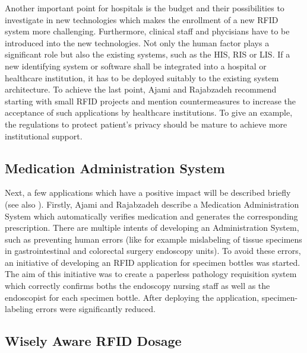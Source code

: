 Another important point for hospitals is the budget and their possibilities to investigate in new technologies which makes the enrollment of a new RFID system more challenging. Furthermore, clinical staff and phycisians have to be introduced into the new technologies. Not only the human factor plays a significant role but also the existing systems, such as the \ac{HIS}, \ac{RIS} or \ac{LIS}. If a new identifying system or software shall be integrated into a hospital or healthcare institution, it has to be deployed suitably to the existing system architecture. To achieve the last point, Ajami and Rajabzadeh \cite{ncbi} recommend starting with small RFID projects and mention countermeasures to increase the acceptance of such applications by healthcare institutions. To give an example, the regulations to protect patient's privacy should be mature to achieve more institutional support.

\subsection{Medication Administration System}

Next, a few applications which have a positive impact will be described briefly (see also \cite{ncbi}). Firstly, Ajami and Rajabzadeh describe a Medication Administration System which automatically verifies medication and generates the corresponding prescription. There are multiple intents of developing an Administration System, such as preventing human errors (like for example mislabeling of tissue specimens in gastrointestinal and colorectal surgery endoscopy units). To avoid these errors, an initiative of developing an RFID application for specimen bottles was started. The aim of this initiative was to create a paperless pathology requisition system which correctly confirms boths the endoscopy nursing staff as well as the endoscopist for each specimen bottle. After deploying the application, specimen-labeling errors were significantly reduced.

\subsection{Wisely Aware RFID Dosage}

